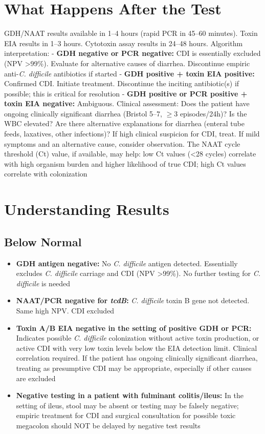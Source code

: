 \section*{What Happens After the Test}
GDH/NAAT results available in 1--4 hours (rapid PCR in 45--60 minutes). Toxin EIA results in 1--3 hours. Cytotoxin assay results in 24--48 hours. Algorithm interpretation:
  - \textbf{GDH negative or PCR negative:} CDI is essentially excluded (NPV >99\%). Evaluate for alternative causes of diarrhea. Discontinue empiric anti-\textit{C. difficile} antibiotics if started
  - \textbf{GDH positive + toxin EIA positive:} Confirmed CDI. Initiate treatment. Discontinue the inciting antibiotic(s) if possible; this is critical for resolution
  - \textbf{GDH positive or PCR positive + toxin EIA negative:} Ambiguous. Clinical assessment: Does the patient have ongoing clinically significant diarrhea (Bristol 5--7, $\geq$3 episodes/24h)? Is the WBC elevated? Are there alternative explanations for diarrhea (enteral tube feeds, laxatives, other infections)? If high clinical suspicion for CDI, treat. If mild symptoms and an alternative cause, consider observation. The NAAT cycle threshold (Ct) value, if available, may help: low Ct values (<28 cycles) correlate with high organism burden and higher likelihood of true CDI; high Ct values correlate with colonization

\section*{Understanding Results}

\subsection*{Below Normal}
\begin{itemize}
  \item \textbf{GDH antigen negative:} No \textit{C. difficile} antigen detected. Essentially excludes \textit{C. difficile} carriage and CDI (NPV >99\%). No further testing for \textit{C. difficile} is needed
  \item \textbf{NAAT/PCR negative for \textit{tcdB}:} \textit{C. difficile} toxin B gene not detected. Same high NPV. CDI excluded
  \item \textbf{Toxin A/B EIA negative in the setting of positive GDH or PCR:} Indicates possible \textit{C. difficile} colonization without active toxin production, or active CDI with very low toxin levels below the EIA detection limit. Clinical correlation required. If the patient has ongoing clinically significant diarrhea, treating as presumptive CDI may be appropriate, especially if other causes are excluded
  \item \textbf{Negative testing in a patient with fulminant colitis/ileus:} In the setting of ileus, stool may be absent or testing may be falsely negative; empiric treatment for CDI and surgical consultation for possible toxic megacolon should NOT be delayed by negative test results
\end{itemize}


